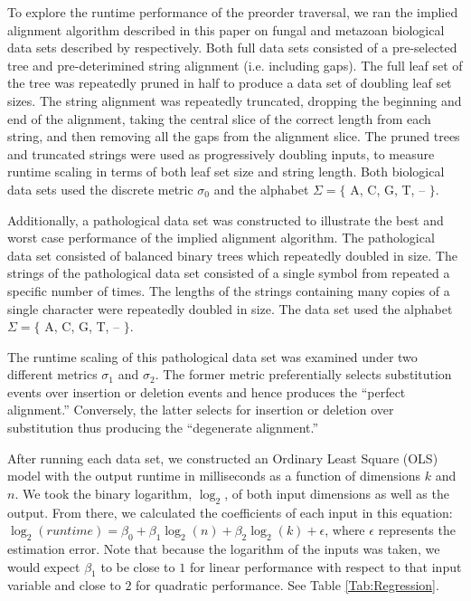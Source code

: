 \documentclass[11pt]{article}
\begin{document}
To explore the runtime performance of the preorder traversal, we ran the implied alignment algorithm described in this paper on fungal and metazoan biological data sets described by \cite{GiribetandWheeler1999, GiribetandWheeler2001} respectively.
Both full data sets consisted of a pre-selected tree and pre-deterimined string alignment (i.e. including gaps).
The full leaf set of the tree was repeatedly pruned in half to produce a data set of doubling leaf set sizes.
The string alignment was repeatedly truncated, dropping the beginning and end of the alignment, taking the central slice of the correct length from each string, and then removing all the gaps from the alignment slice.
The pruned trees and truncated strings were used as progressively doubling inputs, to measure runtime scaling in terms of both leaf set size and string length.
Both biological data sets used the discrete metric $\sigma_0$ and the alphabet $\Sigma = \{$ A, C, G, T, -- $\}$.

Additionally, a pathological data set was constructed to illustrate the best and worst case performance of the implied alignment algorithm.
The pathological data set consisted of balanced binary trees which repeatedly doubled in size.
The strings of the pathological data set consisted of a single symbol from repeated a specific number of times.
The lengths of the strings containing many copies of a single character were repeatedly doubled in size.
The data set used the alphabet $\Sigma = \{$ A, C, G, T, -- $\}$.

The runtime scaling of this pathological data set was examined under two different metrics $\sigma_1$ and $\sigma_2$.
The former metric preferentially selects substitution events over insertion or deletion events and hence produces the ``perfect alignment.''
Conversely, the latter selects for insertion or deletion over substitution thus producing the ``degenerate alignment.''


After running each data set, we constructed an Ordinary Least Square (OLS) model with the output runtime in milliseconds as a function of dimensions $k$ and $n$.
We took the binary logarithm, $\log_{2}$, of both input dimensions as well as the output.
From there, we calculated the coefficients of each input in this equation: $\log_2(runtime) = \beta_0 + \beta_1 \log_2(n) + \beta_2 \log_2(k) + \epsilon$, where $\epsilon$ represents the estimation error.
Note that because the logarithm of the inputs was taken, we would expect $\beta_1$ to be close to $1$ for linear performance with respect to that input variable and close to $2$ for quadratic performance.
See Table \ref{Tab:Regression}.
\end{document}
